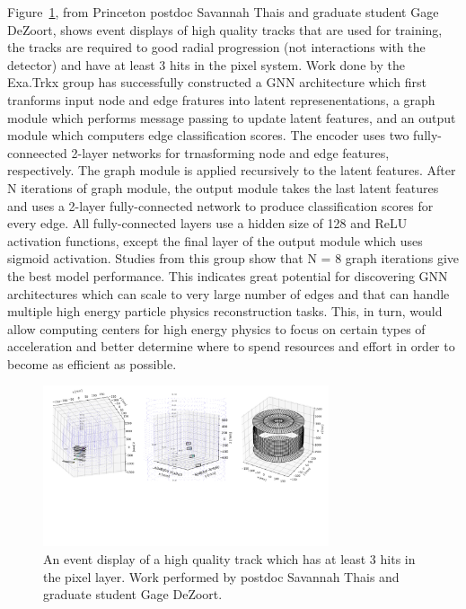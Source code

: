 \documentclass[preprint,12pt]{elsarticle}
\begin{document}
Figure~\ref{fig:goodtracks}, from Princeton postdoc Savannah Thais and graduate student Gage DeZoort,
shows event displays of high quality tracks that are used for training, the tracks are required to
good radial progression (not interactions with the detector) and  have at least 3 hits in the pixel system.
Work done by the Exa.Trkx group %
has successfully constructed a GNN architecture which first tranforms input node and edge
fratures into latent represenentations, a graph module which performs message passing to
update latent features, and an output module which computers edge classification scores.
The encoder uses two fully-conneected 2-layer networks for trnasforming node and edge
features, respectively. The graph module is applied recursively to the latent features.
After N iterations of graph module, the output module takes the last latent features
and uses a 2-layer fully-connected network to produce classification scores for every
edge. All fully-connected layers use a hidden size of 128 and ReLU activation functions,
except the final layer of the output module which uses sigmoid activation.
Studies from this group show that N = 8 graph iterations give the best model
performance.
This indicates great potential for discovering GNN architectures which can scale 
to very large number of edges and that can handle multiple high energy particle 
physics reconstruction tasks. This, in turn, would allow computing centers for 
high energy physics to focus on certain types of acceleration and better determine 
where to spend resources and effort in order to become as efficient as possible.

\begin{figure}[htbp]
\centering
     \includegraphics[trim=0 0 0 120,clip,width=0.75\textwidth]{Good_Track_event_display.jpeg}
     \caption{An event display of a high quality track which has at least 3 hits in the pixel layer. Work performed by postdoc Savannah Thais and graduate student Gage DeZoort.}
     \label{fig:goodtracks}
\end{figure}
\end{document}
